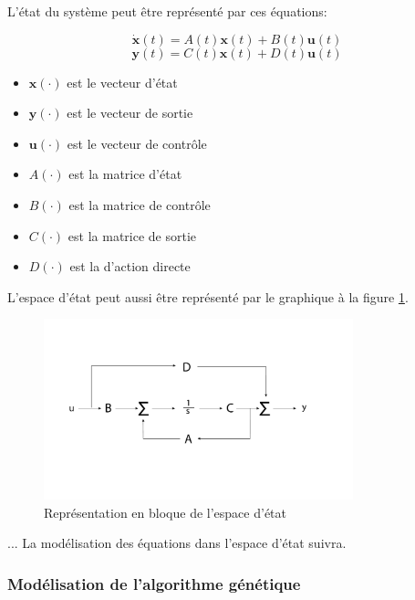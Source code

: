 L'état du système peut être représenté par ces équations:

\begin{equation}
\dot{\mathbf{x}}(t) = A(t) \mathbf{x}(t) + B(t) \mathbf{u}(t)
\end{equation}
\begin{equation}
\mathbf{y}(t) = C(t) \mathbf{x}(t) + D(t) \mathbf{u}(t)
\end{equation}

\begin{itemize}
  \item $\mathbf{x}(\cdot)$ est le vecteur d'état
  \item $\mathbf{y}(\cdot)$ est le vecteur de sortie
  \item $\mathbf{u}(\cdot)$ est le vecteur de contrôle
  \item $A(\cdot)$ est la matrice d'état
  \item $B(\cdot)$ est la matrice de contrôle
  \item $C(\cdot)$ est la matrice de sortie
  \item $D(\cdot)$ est la d'action directe
\end{itemize}

L'espace d'état peut aussi être représenté par le graphique à la figure \ref{fig:statespace}.

\begin{figure}[H]
\label{fig:statespace}
\centering
\includegraphics[width=0.8\textwidth]{images/statespace.pdf}
\caption{Représentation en bloque de l'espace d'état}
\end{figure}


... La modélisation des équations dans l'espace d'état suivra.

\subsubsection{Modélisation de l'algorithme génétique}


